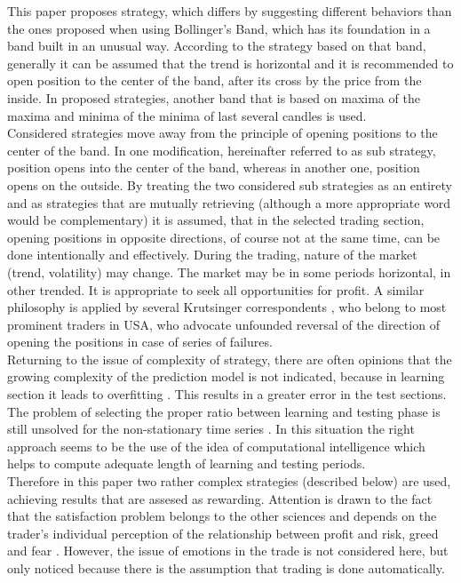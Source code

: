 \documentclass{tewiart}
\begin{document}
This paper proposes strategy, which differs by suggesting different behaviors than the ones proposed when using Bollinger's Band, which has its foundation in a band built in an unusual way. According to the strategy based on that band, generally it can be assumed that the trend is horizontal and it is recommended to open position to the center of the band, after its cross by the price from the inside. In proposed strategies, another band that is based on maxima of the maxima and minima of the minima of last several candles is used.\\

Considered strategies move away from the principle of opening positions to the center of the band. In one modification, hereinafter referred to as sub strategy, position opens into the center of the band, whereas in another one, position opens on the outside. By treating the two considered sub strategies as an entirety and as strategies that are mutually retrieving (although a more appropriate word would be complementary) it is assumed, that in the selected trading section, opening positions in opposite directions, of course not at the same time, can be done intentionally and effectively. During the trading, nature of the market (trend, volatility) may change. The market may be in some periods horizontal, in other trended. It is appropriate to seek all opportunities for profit. A similar philosophy is applied by several Krutsinger correspondents \cite{Krutsinger}, who belong to most prominent traders in USA, who advocate unfounded reversal of the direction of opening the positions in case of series of failures.\\

Returning to the issue of complexity of strategy, there are often opinions that the growing complexity of the prediction model is not indicated, because in learning section it  leads to overfitting \cite{Murphy, Cai, Fujimoto}. This results in a greater error in the test sections. The problem of selecting the proper ratio between learning and testing phase is still unsolved for the non-stationary time series \cite{Ball, Ivakhnenko}. In this situation the right approach seems to be the use of the idea of computational intelligence \cite{Polya, Pedrycz} which helps to compute adequate length of learning and testing periods.\\

Therefore in this paper two rather complex strategies (described below) are used, achieving results that are assesed as rewarding. Attention is drawn to the fact that the satisfaction problem belongs to the other sciences and depends on the trader's individual perception of the relationship between profit and risk, greed and fear \cite{Kahneman}. However, the issue of emotions in the trade is not considered here, but only noticed because there is the assumption that trading is done automatically.\\ 
\end{document}
